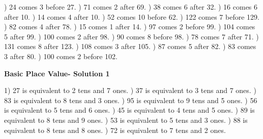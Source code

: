 \documentclass{article}%
\begin{document}
) 24 comes 3 before 27.%
) 71 comes 2 after 69.%
) 38 comes 6 after 32.%
) 16 comes 6 after 10.%
) 14 comes 4 after 10.%
) 52 comes 10 before 62.%
) 122 comes 7 before 129.%
) 82 comes 4 after 78.%
) 15 comes 1 after 14.%
) 97 comes 2 before 99.%
) 104 comes 5 after 99.%
) 100 comes 2 after 98.%
) 90 comes 8 before 98.%
) 78 comes 7 after 71.%
) 131 comes 8 after 123.%
) 108 comes 3 after 105.%
) 87 comes 5 after 82.%
) 83 comes 3 after 80.%
) 100 comes 2 before 102.%
\newline%
\newpage%
\large%
\begin{center}%
\textbf{Basic Place Value- Solution 1}%
\newline%
\end{center} \normalsize%
1) 27 is equivalent to  2 tens and 7 ones.%
) 37 is equivalent to  3 tens and 7 ones.%
) 83 is equivalent to  8 tens and 3 ones.%
) 95 is equivalent to  9 tens and 5 ones.%
) 56 is equivalent to  5 tens and 6 ones.%
) 45 is equivalent to  4 tens and 5 ones.%
) 89 is equivalent to  8 tens and 9 ones.%
) 53 is equivalent to  5 tens and 3 ones.%
) 88 is equivalent to  8 tens and 8 ones.%
) 72 is equivalent to  7 tens and 2 ones.%
\end{document}
